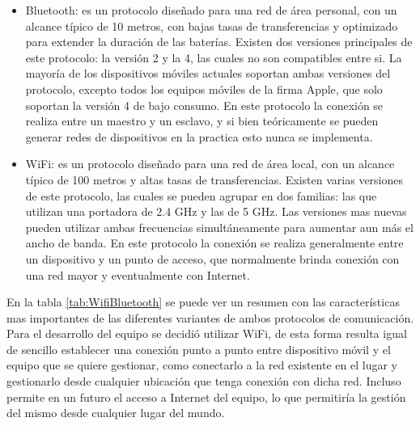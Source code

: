 \begin{itemize}
	\item Bluetooth: es un protocolo diseñado para una red de área personal, con un alcance típico de 10 metros, con bajas tasas de transferencias y optimizado para extender la duración de las baterías. Existen dos versiones principales de este protocolo: la versión 2 y la 4, las cuales no son compatibles entre si. La mayoría de los dispositivos móviles actuales soportan ambas versiones del protocolo, excepto todos los equipos móviles de la firma Apple, que solo soportan la versión 4 de bajo consumo. En este protocolo la conexión se realiza entre un maestro y un esclavo, y si bien teóricamente se pueden generar redes de dispositivos en la practica esto nunca se implementa.
	
	\item WiFi: es un protocolo diseñado para una red de área local, con un alcance típico de 100 metros y altas tasas de transferencias. Existen varias versiones de este protocolo, las cuales se pueden agrupar en dos familias: las que utilizan una portadora de 2.4 GHz y las de 5 GHz. Las versiones mas nuevas pueden utilizar ambas frecuencias simultáneamente para aumentar aun más el ancho de banda. En este protocolo la conexión se realiza generalmente entre un dispositivo y un punto de acceso, que normalmente brinda conexión con una red mayor y eventualmente con Internet.
\end{itemize}

En la tabla \ref{tab:WifiBluetooth} se puede ver un resumen con las características mas importantes de las diferentes variantes de ambos protocolos de comunicación. Para el desarrollo del equipo se decidió utilizar WiFi, de esta forma resulta igual de sencillo establecer una conexión punto a punto entre dispositivo móvil y el equipo que se quiere gestionar, como conectarlo a la red existente en el lugar y gestionarlo desde cualquier ubicación que tenga conexión con dicha red. Incluso permite en un futuro el acceso a Internet del equipo, lo que permitiría la gestión del mismo desde cualquier lugar del mundo.

